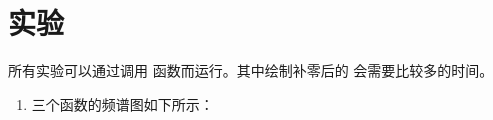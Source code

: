 \newpage

\section{实验}

所有实验可以通过调用  函数而运行。其中绘制补零后的  会需要比较多的时间。

\begin{enumerate}
    \item 三个函数的频谱图如下所示：
    \begin{figure}[h!]
        \centering
        \begin{subfigure}{0.3\linewidth}
            \centering
            \scalebox{0.4}{}
        \end{subfigure}
        \begin{subfigure}{0.3\linewidth}
            \centering
            \scalebox{0.4}{}
        \end{subfigure}
        \begin{subfigure}{0.3\linewidth}
            \centering
            \scalebox{0.4}{}
        \end{subfigure}
        \\
        \begin{subfigure}{0.3\linewidth}
            \centering
            \scalebox{0.4}{}
        \end{subfigure}
        \begin{subfigure}{0.3\linewidth}
            \centering
            \scalebox{0.4}{}
        \end{subfigure}
        \begin{subfigure}{0.3\linewidth}
            \centering
            \scalebox{0.4}{}
        \end{subfigure}
        \\
        \centering
        \begin{subfigure}{0.3\linewidth}
            \centering
            \scalebox{0.4}{}
        \end{subfigure}
        \begin{subfigure}{0.3\linewidth}
            \centering
            \scalebox{0.4}{}
        \end{subfigure}
        \begin{subfigure}{0.3\linewidth}
            \centering
            \scalebox{0.4}{}
        \end{subfigure}
    \end{figure}


\end{enumerate}
